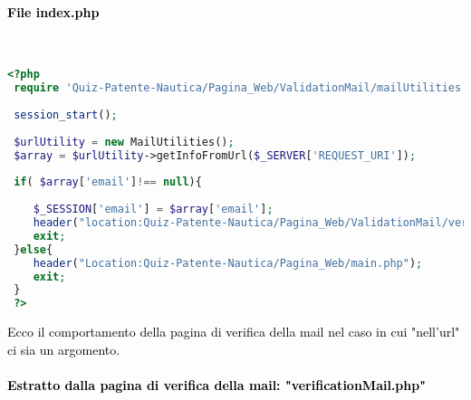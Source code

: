  \paragraph{\textcolor{black}{File index.php}}\leavevmode\\
  \raggedright
 \begin{lstlisting}[language=php]
 <?php
 require 'Quiz-Patente-Nautica/Pagina_Web/ValidationMail/mailUtilities.php';
 
 session_start();
 
 $urlUtility = new MailUtilities();
 $array = $urlUtility->getInfoFromUrl($_SERVER['REQUEST_URI']);
 
 if( $array['email']!== null){	
 	
 	$_SESSION['email'] = $array['email'];
 	header("location:Quiz-Patente-Nautica/Pagina_Web/ValidationMail/verificationMail.php");
 	exit;
 }else{
 	header("Location:Quiz-Patente-Nautica/Pagina_Web/main.php");
 	exit;
 }
 ?>
 \end{lstlisting}
 
 \raggedright
 \textcolor{black}{Ecco il comportamento della pagina di verifica della mail nel caso in cui "nell'url" ci sia un argomento.}\\
 
 \newpage
 
\paragraph{\textcolor{black}{Estratto dalla pagina di verifica della mail: "verificationMail.php"}}\leavevmode\\
 
